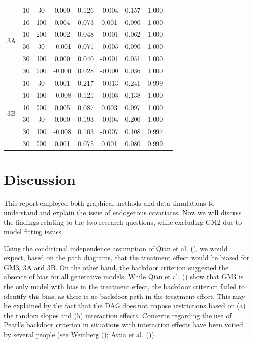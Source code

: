 \documentclass[
  12pt,
  a4paper,
]{article}
\begin{document}
\begin{table}
{\begin{tabular}{@{}lcccccccc@{}}
\midrule
\multirow{6}{*}{3A} & 10 & 30 & 0.000 & 0.126 & -0.004 & 0.157 & 1.000 \\ 
   & 10 & 100 & 0.004 & 0.073 & 0.001 & 0.090 & 1.000 \\ 
   & 10 & 200 & 0.002 & 0.048 & -0.001 & 0.062 & 1.000 \\ 
   & 30 & 30 & -0.001 & 0.071 & -0.003 & 0.090 & 1.000 \\ 
   & 30 & 100 & 0.000 & 0.040 & -0.001 & 0.051 & 1.000 \\ 
   & 30 & 200 & -0.000 & 0.028 & -0.000 & 0.036 & 1.000 \\ 
\midrule
\multirow{6}{*}{3B} & 10 & 30 & 0.001 & 0.217 & -0.013 & 0.241 & 0.999 \\ 
   & 10 & 100 & -0.008 & 0.121 & -0.008 & 0.138 & 1.000 \\ 
   & 10 & 200 & 0.005 & 0.087 & 0.003 & 0.097 & 1.000 \\ 
   & 30 & 30 & 0.000 & 0.193 & -0.004 & 0.200 & 1.000 \\ 
   & 30 & 100 & -0.008 & 0.103 & -0.007 & 0.108 & 0.997 \\ 
   & 30 & 200 & 0.001 & 0.075 & 0.001 & 0.080 & 0.999 \\ 
\bottomrule
\end{tabular}

}

\end{table}%

\section{Discussion}\label{discussion}

This report employed both graphical methods and data simulations to
understand and explain the issue of endogenous covariates. Now we will
discuss the findings relating to the two research questions, while
excluding GM2 due to model fitting issues.

Using the conditional independence assumption of Qian et al.
(), we would expect, based on the path
diagrams, that the treatment effect would be biased for GM3, 3A and 3B.
On the other hand, the backdoor criterion suggested the absence of bias
for all generative models. While Qian et al.
() show that GM3 is the only model with
bias in the treatment effect, the backdoor criterion failed to identify
this bias, as there is no backdoor path in the treatment effect. This
may be explained by the fact that the DAG does not impose restrictions
based on (a) the random slopes and (b) interaction effects. Concerns
regarding the use of Pearl's backdoor criterion in situations with
interaction effects have been voiced by several people (see Weinberg
(); Attia et al.
()).
\end{document}
